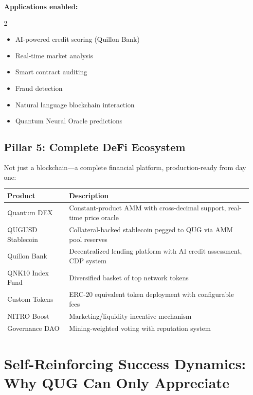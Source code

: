 \documentclass[11pt,a4paper]{article}
\begin{document}
\textbf{Applications enabled:}
\begin{multicols}{2}
\begin{itemize}[leftmargin=1.5em]
    \item AI-powered credit scoring (Quillon Bank)
    \item Real-time market analysis
    \item Smart contract auditing
    \item Fraud detection
    \item Natural language blockchain interaction
    \item Quantum Neural Oracle predictions
\end{itemize}
\end{multicols}

\subsection{Pillar 5: Complete DeFi Ecosystem}

Not just a blockchain---a complete financial platform, production-ready from day one:

\begin{center}
\begin{tabular}{@{}p{4cm}p{10cm}@{}}
\toprule
\textbf{Product} & \textbf{Description} \\
\midrule
Quantum DEX & Constant-product AMM with cross-decimal support, real-time price oracle \\
QUGUSD Stablecoin & Collateral-backed stablecoin pegged to QUG via AMM pool reserves \\
Quillon Bank & Decentralized lending platform with AI credit assessment, CDP system \\
QNK10 Index Fund & Diversified basket of top network tokens \\
Custom Tokens & ERC-20 equivalent token deployment with configurable fees \\
NITRO Boost & Marketing/liquidity incentive mechanism \\
Governance DAO & Mining-weighted voting with reputation system \\
\bottomrule
\end{tabular}
\end{center}


\section{Self-Reinforcing Success Dynamics: Why QUG Can Only Appreciate}
\end{document}
